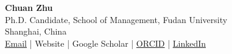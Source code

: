 \begin{center}
{\Large \textbf{Chuan Zhu}}\\
Ph.D. Candidate, School of Management, Fudan University\\
Shanghai, China\\
\href{mailto:zhuc21@m.fudan.edu.cn}{Email} \quad | \quad Website \quad | \quad Google Scholar \quad | \quad \href{https://orcid.org/0009-0006-7660-3598}{ORCID} \quad | \quad \href{https://www.linkedin.com/in/chuan-zhu-86692a169/}{LinkedIn}
\end{center}

